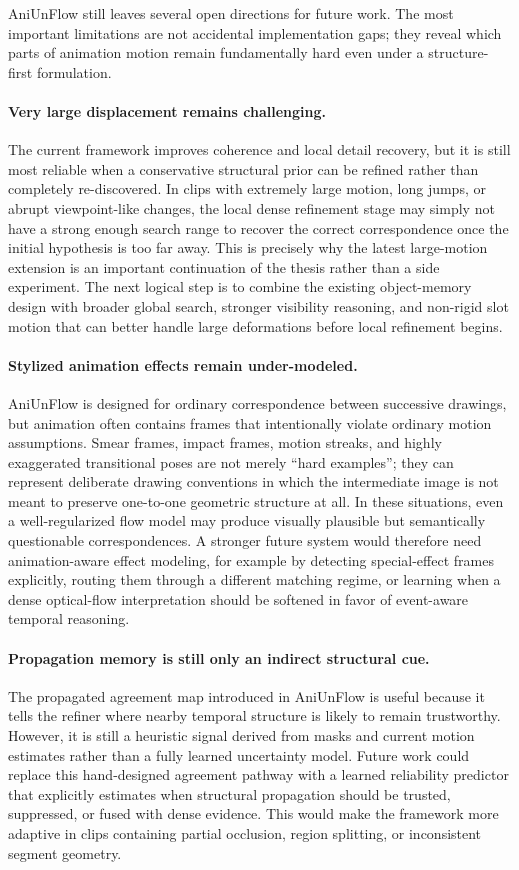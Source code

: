 AniUnFlow still leaves several open directions for future work. The most important limitations are not accidental implementation gaps; they reveal which parts of animation motion remain fundamentally hard even under a structure-first formulation.

\paragraph{Very large displacement remains challenging.}
The current framework improves coherence and local detail recovery, but it is still most reliable when a conservative structural prior can be refined rather than completely re-discovered. In clips with extremely large motion, long jumps, or abrupt viewpoint-like changes, the local dense refinement stage may simply not have a strong enough search range to recover the correct correspondence once the initial hypothesis is too far away. This is precisely why the latest large-motion extension is an important continuation of the thesis rather than a side experiment. The next logical step is to combine the existing object-memory design with broader global search, stronger visibility reasoning, and non-rigid slot motion that can better handle large deformations before local refinement begins.

\paragraph{Stylized animation effects remain under-modeled.}
AniUnFlow is designed for ordinary correspondence between successive drawings, but animation often contains frames that intentionally violate ordinary motion assumptions. Smear frames, impact frames, motion streaks, and highly exaggerated transitional poses are not merely ``hard examples''; they can represent deliberate drawing conventions in which the intermediate image is not meant to preserve one-to-one geometric structure at all. In these situations, even a well-regularized flow model may produce visually plausible but semantically questionable correspondences. A stronger future system would therefore need animation-aware effect modeling, for example by detecting special-effect frames explicitly, routing them through a different matching regime, or learning when a dense optical-flow interpretation should be softened in favor of event-aware temporal reasoning.

\paragraph{Propagation memory is still only an indirect structural cue.}
The propagated agreement map introduced in AniUnFlow is useful because it tells the refiner where nearby temporal structure is likely to remain trustworthy. However, it is still a heuristic signal derived from masks and current motion estimates rather than a fully learned uncertainty model. Future work could replace this hand-designed agreement pathway with a learned reliability predictor that explicitly estimates when structural propagation should be trusted, suppressed, or fused with dense evidence. This would make the framework more adaptive in clips containing partial occlusion, region splitting, or inconsistent segment geometry.

